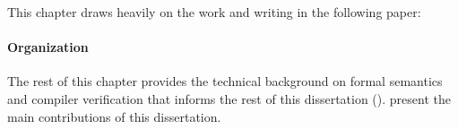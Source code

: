 
This chapter draws heavily on the work and writing in the following paper:



\paragraph{Organization}

The rest of this chapter provides the technical background on formal semantics and compiler
verification that informs the rest of this dissertation ().
 present the main contributions of this
dissertation.  %






